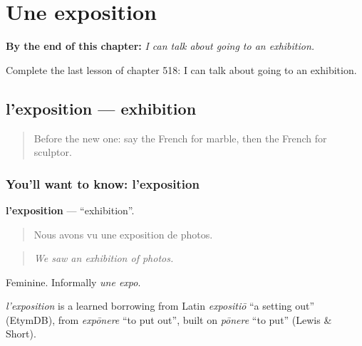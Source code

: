
\chapter{Une exposition}
\label{ch:fr-une-exposition}

\begin{chapteropening}
\textbf{By the end of this chapter:} \emph{I can talk about going to an exhibition.}

Complete the last lesson of chapter 518: I can talk about going to an exhibition.
\end{chapteropening}

\section[l'exposition]{l'exposition — exhibition}

\label{lesson:FR-C518-exposition}



\begin{quote}
Before the new one: say the French for marble, then the French for sculptor.
\end{quote}

\subsection*{You'll want to know: l'exposition}
\textbf{l'exposition} — \textquotedblleft{}exhibition\textquotedblright{}.

\begin{quote}
Nous avons vu une exposition de photos.
\end{quote}

\begin{quote}
\emph{We saw an exhibition of photos.}
\end{quote}

Feminine. Informally \emph{une expo}.

\begin{cousinweb}
\emph{l'exposition} is a learned borrowing from Latin \emph{expositiō} \textquotedblleft{}a setting out\textquotedblright{} (EtymDB), from \emph{expōnere} \textquotedblleft{}to put out\textquotedblright{}, built on \emph{pōnere} \textquotedblleft{}to put\textquotedblright{} (Lewis \& Short).
\end{cousinweb}

